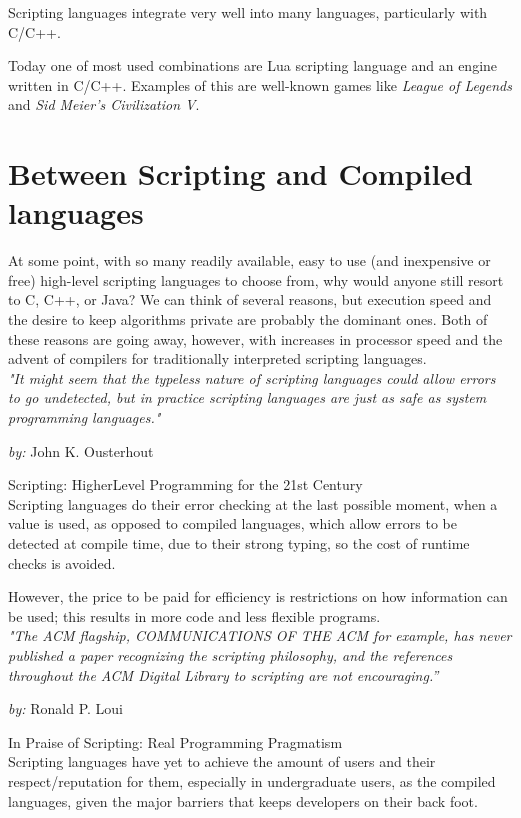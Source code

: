 \documentclass[12pt]{article}
\begin{document}
Scripting languages integrate very well into many languages, particularly with C/C++.

Today one of most used combinations are Lua scripting language and an engine written in C/C++. Examples of this are well-known games like \textit{League of Legends} and \textit{Sid Meier's Civilization V}.


\section{Between Scripting and Compiled languages}
At some point, with so many readily available, easy to use (and inexpensive or free) high-level scripting languages to choose from, why would anyone still resort to C, C++, or Java? We can think of several reasons, but execution speed and the desire to keep algorithms private are probably the dominant ones. Both of these reasons are going away, however, with increases in processor speed and the advent of compilers for traditionally interpreted scripting languages. \\

\emph{"It might seem that the typeless nature of scripting languages could allow errors to go undetected, but in practice scripting languages are just as safe as system programming languages."}

\emph{by: } John K. Ousterhout

Scripting: HigherLevel Programming for the 21st Century\\

Scripting languages do their error checking at the last possible moment, when a value is used, as opposed to compiled languages, which allow errors to be detected at compile time, due to their strong typing, so the cost of runtime checks is avoided.

However, the price to be paid for efficiency is restrictions on how information can be used; this results in more code and less flexible programs.\\

\emph{"The ACM flagship, COMMUNICATIONS OF THE ACM for example, has never published a paper recognizing the scripting philosophy, and the references throughout the ACM Digital Library to scripting are not encouraging.”}

\emph{by: } Ronald P. Loui

In Praise of Scripting:  Real Programming Pragmatism\\
 
Scripting languages have yet to achieve the amount of users and their respect/reputation for them, especially in undergraduate users, as the compiled languages, given the major barriers that keeps developers on their back foot.
\end{document}
